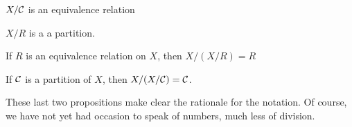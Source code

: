 \begin{proposition}
  $X/\mathcal{C}$ is an equivalence relation
\end{proposition}
\begin{proposition}
  $X/R$ is a a partition.
\end{proposition}

\begin{proposition}
  If $R$ is an equivalence relation on $X$, then $X/(X/R) = R$
\end{proposition}

\begin{proposition}
  If $\mathcal{C}$ is a partition of $X$, then $X/(X/\mathcal{C}) = \mathcal{C}$.
\end{proposition}

These last two propositions make clear the rationale for the notation.
Of course, we have not yet had occasion to speak of numbers, much less of division.



%
%
%
%
%
%
%
%
